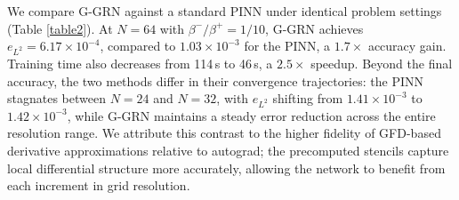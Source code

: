 \documentclass[11pt]{article}
\theoremstyle{definition}
\theoremstyle{remark}
\theoremstyle{plain}
\begin{document}
\begin{table}[htbp]
    \centering
     \caption{The MSE, relative $L^2$, relative $L^\infty$ errors and CPU time of G-GRN method in Example \ref{ex1} where $\beta^{-}/\beta{+} \in \{1/10, 1/100, 10/1\}$.}
    \label{table1}
\end{table}

We compare G-GRN against a standard PINN under identical problem settings (Table \ref{table2}). At $N = 64$ with $\beta^{-}/\beta^{+} = 1/10$, G-GRN achieves $e_{L^2} = 6.17 \times 10^{-4}$, compared to $1.03 \times 10^{-3}$ for the PINN, a $1.7\times$ accuracy gain. Training time also decreases from 114\,s to 46\,s, a $2.5\times$ speedup. Beyond the final accuracy, the two methods differ in their convergence trajectories: the PINN stagnates between $N = 24$ and $N = 32$, with $e_{L^2}$ shifting from $1.41 \times 10^{-3}$ to $1.42 \times 10^{-3}$, while G-GRN maintains a steady error reduction across the entire resolution range. We attribute this contrast to the higher fidelity of GFD-based derivative approximations relative to autograd; the precomputed stencils capture local differential structure more accurately, allowing the network to benefit from each increment in grid resolution.
\end{document}
